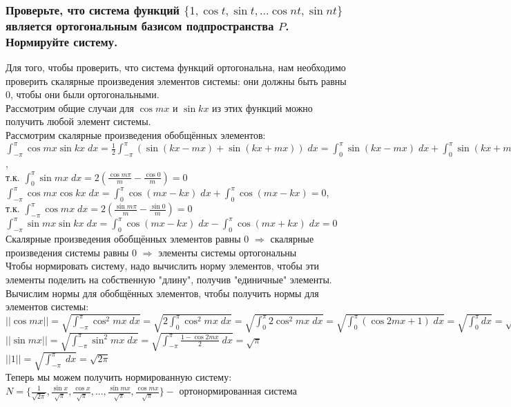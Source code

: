 \documentclass{article}
\begin{document}
    \subsubsection{Проверьте, что система функций $\{1, \cos t, \sin t, ... \cos nt, \sin nt\}$ является ортогональным базисом подпространства $P$. Нормируйте систему.}
    Для того, чтобы проверить, что система функций ортогональна, нам необходимо проверить скалярные произведения элементов системы: они должны быть равны 0, чтобы они были ортогональными.\\
    Рассмотрим общие случаи для $\cos mx$ и $\sin kx$ из этих функций можно получить любой элемент системы.\\
    Рассмотрим скалярные произведения обобщённых элементов:\\
    $\int_{-\pi}^\pi \cos mx \sin kx \; dx = \frac{1}{2} \int_{-\pi}^\pi (\sin(kx - mx) + \sin(kx + mx)) \; dx = \int_{0}^\pi \sin(kx-mx) \; dx + \int_{0}^\pi \sin(kx+mx) \; dx = 0$, \\
    т.к. $\int_{0}^\pi \sin mx \; dx = 2(\frac{\cos m \pi}{m} - \frac{\cos 0}{m}) = 0$\\
    $\int_{-\pi}^\pi \cos mx \cos kx \; dx = \int_{0}^\pi \cos(mx-kx) \; dx + \int_{0}^\pi \cos (mx-kx) = 0$, \\
    т.к. $\int_{-\pi}^\pi \cos mx \; dx = 2(\frac{\sin m \pi}{m} - \frac{\sin 0}{m}) = 0$\\
    $\int_{-\pi}^\pi \sin mx \sin kx \; dx = \int_{0}^\pi \cos(mx-kx) \; dx - \int_{0}^\pi \cos (mx+kx) \; dx = 0$\\
    Скалярные произведения обобщённых элементов равны 0 $\Rightarrow$ скалярные произведения системы равны 0 $\Rightarrow$ элементы системы ортогональны\\
    Чтобы нормировать систему, надо вычислить норму элементов, чтобы эти элементы поделить на собственную "длину", получив "единичные" элементы. \\
    Вычислим нормы для обобщённых элементов, чтобы получить нормы для элементов системы: \\
    $|| \cos mx || = \sqrt{\int_{-\pi}^\pi \cos^2 mx \; dx} = \sqrt{2\int_{0}^\pi \cos^2 mx \; dx }= \sqrt{\int_{0}^\pi 2\cos^2 mx \; dx }= \sqrt{\int_{0}^\pi (\cos 2mx + 1)\; dx} = \sqrt{\int_{0}^\pi dx} = \sqrt{\pi}$\\
    $|| \sin mx || = \sqrt{\int_{-\pi}^\pi \sin^2 mx \; dx} = \sqrt{\int_{-\pi}^\pi \frac{1 - \cos 2mx}{2} \; dx} = \sqrt{\pi}$\\
    $||1|| = \sqrt{\int_{-\pi}^\pi \; dx} = \sqrt{2 \pi}$ \\
    Теперь мы можем получить нормированную систему:\\
    $N = \{\frac{1}{\sqrt{2\pi}}, \frac{\sin x}{\sqrt{\pi}}, \frac{\cos x}{\sqrt{\pi}}, ... , \frac{\sin mx}{\sqrt{\pi}}, \frac{\cos mx}{\sqrt{\pi}}\} -$ ортонормированная система
    
\end{document}
